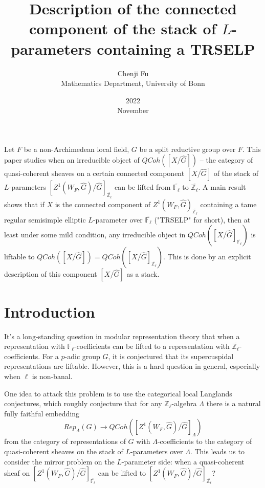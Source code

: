 \documentclass{article}
\title{Description of the connected component of the stack of $L$-parameters containing a TRSELP}
\date{2022\\ November}
\author{Chenji Fu\\ Mathematics Department, University of Bonn}
\newcommand{\red}[1]{\textcolor{red}{#1}}
\begin{document}
	\maketitle
	
	
	Let $F$ be a non-Archimedean local field, $G$ be a split reductive group over $F$. This paper studies when an irreducible object of $QCoh([X/\hat{G}])$ -- the category of quasi-coherent sheaves on a certain connected component $[X/\hat{G}]$ of the stack of $L$-parameters $[Z^1(W_F, \hat{G})/\hat{G}]_{\overline{\mathbb{Z}_\ell}}$ can be lifted from $\overline{\mathbb{F}_\ell}$ to $\overline{\mathbb{Z}_\ell}$. A main result shows that if $X$ is the connected component of $Z^1(W_F, \hat{G})_{\overline{\mathbb{Z}_\ell}}$ containing a tame regular semisimple elliptic $L$-parameter over $\overline{\mathbb{F}_{\ell}}$ ("TRSELP" for short), then at least under some mild condition, any irreducible object in $QCoh([X/\hat{G}]_{\overline{\mathbb{F}_\ell}})$ is liftable to $QCoh([X/\hat{G}])=QCoh([X/\hat{G}]_{\overline{\mathbb{Z}_\ell}})$. This is done by an explicit description of this component $[X/\hat{G}]$ as a stack.
	
	\section{Introduction}
	
	It's a long-standing question in modular representation theory that when a representation with $\overline{\mathbb{F}_\ell}$-coefficients can be lifted to a representation with $\overline{\mathbb{Z}_\ell}$-coefficients. For a $p$-adic group $G$, it is conjectured that its supercuspidal representations are liftable. However, this is a hard question in general, especially when $\ell$ is non-banal.
	
	One idea to attack this problem is to use the categorical local Langlands conjectures, which roughly conjecture that for any $\mathbb{Z}_{\ell}$-algebra $\Lambda$ there is a natural fully faithful embedding 
	$$Rep_{\Lambda}(G) \to QCoh([Z^1(W_F, \hat{G})/\hat{G}]_{\Lambda})$$
	from the category of representations of $G$ with $\Lambda$-coefficients to the category of quasi-coherent sheaves on the stack of $L$-parameters over $\Lambda$. This leads us to consider the mirror problem on the $L$-parameter side: when a quasi-coherent sheaf on $[Z^1(W_F, \hat{G})/\hat{G}]_{\overline{\mathbb{F}_\ell}}$ can be lifted to $[Z^1(W_F, \hat{G})/\hat{G}]_{\overline{\mathbb{Z}_\ell}}$?
	
\end{document}
